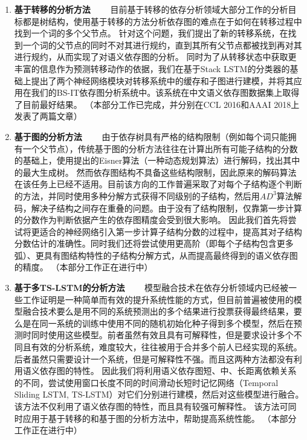 \begin{enumerate}
	\item \textbf{基于转移的分析方法}
	\ \ \ \ 目前基于转移的依存分析领域大部分工作的分析目标都是树结构，使用基于转移的方法分析依存图的难点在于如何在转移过程中找到一个词的多个父节点。
	针对这个问题，我们提出了新的转移系统，在找到一个词的父节点的同时不对其进行规约，直到其所有父节点都被找到再对其进行规约，从而实现了对语义依存图的分析。
	同时为了从转移状态中获取更丰富的信息作为预测转移动作的依据，我们在基于Stack LSTM的分类器的基础上提出了两个神经网络模块对转移系统中的缓存和子图进行建模，并将其应用在我们的BS-IT依存图分析系统中。该系统在中文语义依存图数据集上取得了目前最好结果。
	（本部分工作已完成，并分别在CCL 2016和AAAI 2018上发表了两篇文章）
	
	\item \textbf{基于图的分析方法}
	\ \ \ \ 由于依存树具有严格的结构限制（例如每个词只能拥有一个父节点），传统基于图的分析方法往往在计算出所有可能子结构的分数的基础上，使用提出的Eisner算法（一种动态规划算法）进行解码，找出其中的最大生成树。
	然而依存图结构不具备这些结构限制，因此原来的解码算法在该任务上已经不适用。目前该方向的工作普遍采取了对每个子结构逐个判断的方法，并同时使用多种分解方式获得不同级别的子结构，然后用$AD^3$算法解码，解决子结构之间存在重叠的问题。由于没有了结构限制，仅靠第一步计算的分数作为判断依据产生的依存图精度会受到很大影响。
	因此我们首先将尝试将更适合的神经网络引入第一步计算子结构分数的过程中，提高其对子结构分数估计的准确性。同时我们还将尝试使用更高阶（即每个子结构包含更多弧）、更具有图结构特性的子结构分解方式，从而提高最终得到的语义依存图的精度。
	（本部分工作正在进行中）
	
	\item \textbf{基于多TS-LSTM的分析方法}
	\ \ \ \ 模型融合技术在依存分析领域内已经被一些工作证明是一种简单而有效的提升系统性能的方式，但目前普遍被使用的模型融合技术要么是用不同的系统预测出的多个结果进行投票获得最终结果，要么是在同一系统的训练中使用不同的随机初始化种子得到多个模型，然后在预测时同时使用这些模型。前者虽然有效且具有可解释性，但是要求设计多个不同且有效的分析系统，难度较大，往往被用于合并多个前人已经实现的系统。后者虽然只需要设计一个系统，但是可解释性不强。而且这两种方法都没有利用语义依存图的特性。
	因此我们将利用语义依存图短、中、长距离依赖关系的不同，尝试使用窗口长度不同的时间滑动长短时记忆网络（Temporal Sliding LSTM, TS-LSTM）对它们分别进行建模，然后对这些模型进行融合。该方法不仅利用了语义依存图的特性，而且具有较强可解释性。
	该方法可同时应用于基于转移的和基于图的分析方法中，帮助提高系统性能。
	（本部分工作正在进行中）
	

\end{enumerate}
